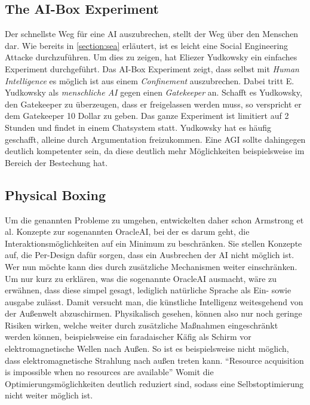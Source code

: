         \subsection{The AI-Box Experiment}
        Der schnellste Weg für eine AI auszubrechen, stellt der Weg über den Menschen dar.\cite[p. 306]{armstrongforthcoming}
        Wie bereits in \ref{section:sea} erläutert, ist es leicht eine Social Engineering Attacke durchzuführen. Um dies
        zu zeigen, hat Eliezer Yudkowsky ein einfaches Experiment durchgeführt. Das AI-Box Experiment zeigt, dass selbst
        mit \textit{Human Intelligence} es möglich ist aus einem \textit{Confinement} auszubrechen. Dabei tritt E.
        Yudkowsky als \textit{menschliche AI} gegen einen \textit{Gatekeeper} an. Schafft es Yudkowsky, den Gatekeeper
        zu überzeugen, dass er freigelassen werden muss, so verspricht er dem Gatekeeper 10 Dollar zu geben. Das ganze
        Experiment ist limitiert auf 2 Stunden und findet in einem Chatsystem statt. Yudkowsky hat es häufig geschafft,
        alleine durch Argumentation freizukommen. Eine AGI sollte dahingegen deutlich kompetenter sein, da diese deutlich
        mehr Möglichkeiten beispielsweise im Bereich der Bestechung hat.

        \subsection{Physical Boxing}

        Um die genannten Probleme zu umgehen, entwickelten daher schon Armstrong et al. Konzepte zur sogenannten OracleAI,
        bei der es darum geht, die Interaktionsmöglichkeiten auf ein Minimum zu beschränken.\cite{armstrongforthcoming}
        Sie stellen Konzepte auf, die Per-Design dafür sorgen, dass ein Ausbrechen der AI nicht möglich ist. Wer nun möchte
        kann dies durch zusätzliche Mechanismen weiter einschränken. Um nur kurz zu erklären, was die sogenannte OracleAI
        ausmacht, wäre zu erwähnen, dass diese simpel gesagt, lediglich natürliche Sprache als Ein- sowie ausgabe zulässt.
        Damit versucht man, die künstliche Intelligenz weitesgehend von der Außenwelt abzuschirmen. Physikalisch gesehen,
        können also nur noch geringe Risiken wirken, welche weiter durch zusätzliche Maßnahmen eingeschränkt werden können,
        beispielsweise ein faradaischer Käfig als Schirm vor elektromagnetische Wellen nach Außen. \cite[p. 308]{armstrongforthcoming}
        So ist es beispielsweise nicht möglich, dass elektromagnetische Strahlung nach außen treten kann.
        ``Resource acquisition is impossible when no resources are available'' \cite[p. 4]{ebhardt2018threat} Womit die
        Optimierungsmöglichkeiten deutlich reduziert sind, sodass eine Selbstoptimierung nicht weiter möglich ist.


